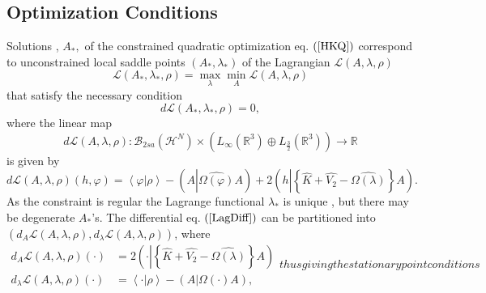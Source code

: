 \documentclass[aps,preprint]{revtex4}%
\begin{document}
\subsection{Optimization Conditions\label{OpCon}}

Solutions , $A_{\ast},$ of the constrained quadratic optimization eq. $\left(
\ref{HKQ}\right)  $ correspond to unconstrained local saddle points $\left(
A_{\ast},\lambda_{\ast}\right)  $ \cite{Hestenes75} of the Lagrangian
$\mathcal{L}\left(  A,\lambda,\rho\right)  $
\begin{equation}
\mathcal{L}\left(  A_{\ast},\lambda_{\ast},\rho\right)  =\max_{\lambda}%
\min_{A}\mathcal{L}\left(  A,\lambda,\rho\right)
\end{equation}
that satisfy the necessary condition
\begin{equation}
d\mathcal{L}\left(  A_{\ast},\lambda_{\ast},\rho\right)  =0,
\end{equation}
where the linear map
\begin{equation}
d\mathcal{L}\left(  A,\lambda,\rho\right)  :\mathcal{B}_{2sa}\left(
\mathcal{H}^{N}\right)  \times\left(  L_{\infty}\left(  \mathbb{R}^{3}\right)
\oplus L_{\frac{3}{2}}\left(  \mathbb{R}^{3}\right)  \right)  \rightarrow
\mathbb{R}%
\end{equation}
is given by%
\begin{equation}
d\mathcal{L}\left(  A,\lambda,\rho\right)  \left(  h,\varphi\right)
=\left\langle \varphi\left\vert \rho\right.  \right\rangle -\left(
A\left\vert \widehat{\Omega\left(  \varphi\right)  }\right.  A\right)
+2\left(  h\left\vert \left\{  \widehat{K}+\widehat{V_{2}}-\widehat
{\Omega\left(  \lambda\right)  }\right\}  \right.  A\right)  . \label{LagDiff}%
\end{equation}
As the constraint is regular the Lagrange functional $\lambda_{\ast}$ is
unique \cite{Hestenes75}, but there may be degenerate $A_{\ast}$'s. The
differential eq. $\left(  \ref{LagDiff}\right)  $ can be partitioned into
$\left(  d_{A}\mathcal{L}\left(  A,\lambda,\rho\right)  ,d_{\lambda
}\mathcal{L}\left(  A,\lambda,\rho\right)  \right)  $, where
\begin{subequations}
\label{differential}%
\begin{align}
d_{A}\mathcal{L}\left(  A,\lambda,\rho\right)  \left(  \cdot\right)   &
=2\left(  \cdot\left\vert \left\{  \widehat{K}+\widehat{V_{2}}-\widehat
{\Omega\left(  \lambda\right)  }\right\}  \right.  A\right) \\
d_{\lambda}\mathcal{L}\left(  A,\lambda,\rho\right)  \left(  \cdot\right)   &
=\left\langle \cdot\left\vert \rho\right.  \right\rangle -\left(  A\left\vert
\Omega\left(  \cdot\right)  \right.  A\right)  ,
\end{align}
thus giving the stationary point conditions
\end{subequations}
\end{document}
